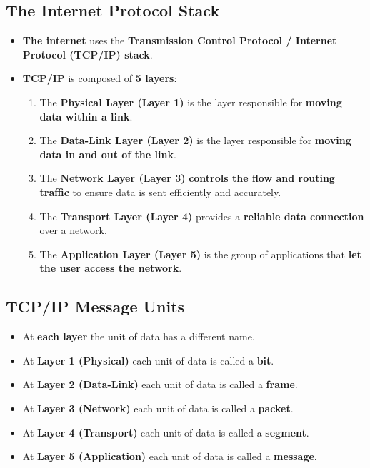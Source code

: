 \documentclass{article}
\begin{document}
   \subsection*{The Internet Protocol Stack}
   \begin{itemize}
       \item \textbf{The internet} uses the \textbf{Transmission Control Protocol / Internet Protocol (TCP/IP) stack}.
       \item \textbf{TCP/IP} is composed of \textbf{5 layers}:
       \begin{enumerate}
           \item The \textbf{Physical Layer (Layer 1)} is the layer responsible for \textbf{moving data within a link}.
           \item The \textbf{Data-Link Layer (Layer 2)} is the layer responsible for \textbf{moving data in and out of the link}.
           \item The \textbf{Network Layer (Layer 3)} \textbf{controls the flow and routing traffic} to ensure data is sent efficiently and accurately.
           \item The \textbf{Transport Layer (Layer 4)} provides a \textbf{reliable data connection} over a network.
           \item The \textbf{Application Layer (Layer 5)} is the group of applications that \textbf{let the user access the network}.
       \end{enumerate}
   \end{itemize}

   \subsection*{TCP/IP Message Units}
   \begin{itemize}
       \item At \textbf{each layer} the unit of data has a different name.
       \item At \textbf{Layer 1 (Physical)} each unit of data is called a \textbf{bit}.
       \item At \textbf{Layer 2 (Data-Link)} each unit of data is called a \textbf{frame}.
       \item At \textbf{Layer 3 (Network)} each unit of data is called a \textbf{packet}.
       \item At \textbf{Layer 4 (Transport)} each unit of data is called a \textbf{segment}.
       \item At \textbf{Layer 5 (Application)} each unit of data is called a \textbf{message}.
   \end{itemize}
\end{document}
